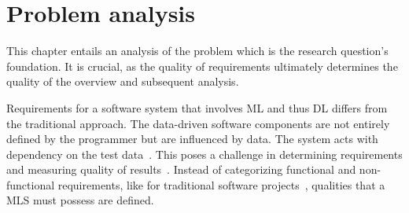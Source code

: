 \chapter{Problem analysis}\label{ch:problem}
This chapter entails an analysis of the problem which is the research question's foundation.
It is crucial, as the quality of requirements ultimately determines the quality of the overview and
subsequent analysis.

Requirements for a software system that involves \ac{ML} and thus \ac{DL} differs from
the traditional approach. The data-driven software components are not entirely defined by the
programmer but are influenced by data.
The system acts with dependency on the test data~\citep{siebert_construction_2021}.
This poses a challenge in determining requirements and measuring quality of
results~\citep{nakamichi_requirements-driven_2020}.
Instead of categorizing functional and non-functional requirements, like for traditional
software projects~\citep{zowghi_requirements_2014}, qualities that a \ac{MLS} must possess
are defined.

